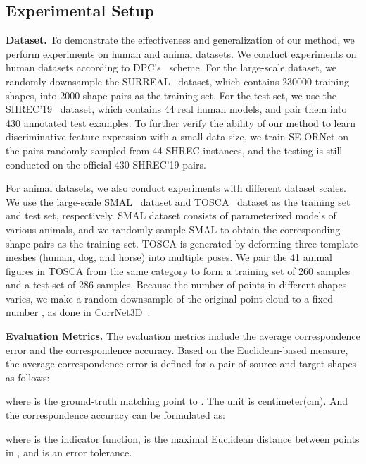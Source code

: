 \subsection{Experimental Setup}
\textbf{Dataset.}
To demonstrate the effectiveness and generalization of our method, we perform experiments on human and animal datasets.
We conduct experiments on human datasets according to DPC's~\cite{lang2021dpc} scheme.
For the large-scale dataset, we randomly downsample the SURREAL~\cite{groueix20183d} dataset, which contains 230000 training shapes, into 2000 shape pairs as the training set.
For the test set, we use the SHREC'19~\cite{melzi2019shrec} dataset, which contains 44 real human models, and pair them into 430 annotated test examples.
To further verify the ability of our method to learn discriminative feature expression with a small data size, we train SE-ORNet on the pairs randomly sampled from 44 SHREC instances, and the testing is still conducted on the official 430 SHREC'19 pairs.


For animal datasets, we also conduct experiments with different dataset scales.
We use the large-scale SMAL~\cite{zuffi20173d} dataset and TOSCA~\cite{bronstein2008numerical} dataset as the training set and test set, respectively.
SMAL dataset consists of parameterized models of various animals, and we randomly sample SMAL to obtain the corresponding shape pairs as the training set.
TOSCA is generated by deforming three template meshes (human, dog, and horse) into multiple poses.
We pair the 41 animal figures in TOSCA from the same category to
form a training set of 260 samples and a test set of 286 samples. 
Because the number of points in different shapes varies, we make a random downsample of the original point cloud to a fixed number  , as done in  CorrNet3D~\cite{zeng2021corrnet3d}.


\textbf{Evaluation Metrics.}
The evaluation metrics include the average correspondence error and the correspondence accuracy.
Based on the Euclidean-based measure, the average correspondence error is defined for a pair of source and target shapes  as follows:

where  is the ground-truth matching point to . 
The unit is centimeter(cm).
And the correspondence accuracy can be formulated as:

where  is the indicator function,  is the maximal Euclidean distance between points in , and  is an error tolerance. 




